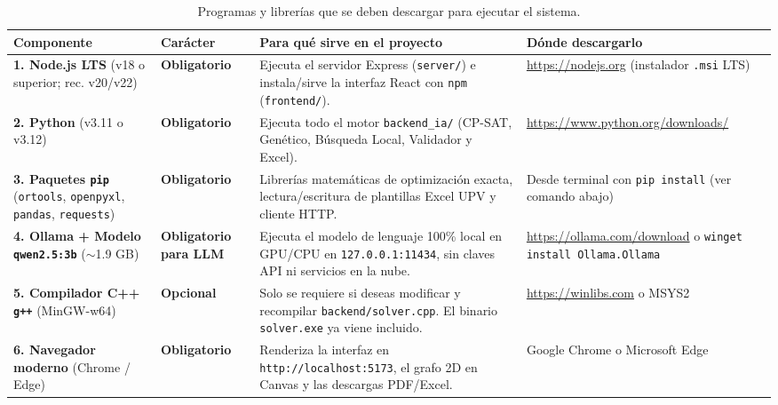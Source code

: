 \documentclass[11pt,letterpaper]{article}
\begin{document}
\begin{table}[htbp]
\centering
\small
\caption{Programas y librerías que se deben descargar para ejecutar el sistema.}
\label{tab:descargas}
\begin{tabularx}{\textwidth}{@{}>{\raggedright\arraybackslash}p{3.2cm}>{\raggedright\arraybackslash}p{2.2cm}>{\raggedright\arraybackslash}X>{\raggedright\arraybackslash}p{4.3cm}@{}}
\toprule
\textbf{Componente} & \textbf{Carácter} & \textbf{Para qué sirve en el proyecto} & \textbf{Dónde descargarlo} \\
\midrule
\textbf{1. Node.js LTS} (v18 o superior; rec. v20/v22) & \textbf{Obligatorio} & Ejecuta el servidor Express (\texttt{server/}) e instala/sirve la interfaz React con \texttt{npm} (\texttt{frontend/}). & \url{https://nodejs.org} (instalador \texttt{.msi} LTS) \\
\addlinespace[3pt]
\textbf{2. Python} (v3.11 o v3.12) & \textbf{Obligatorio} & Ejecuta todo el motor \texttt{backend\_ia/} (CP-SAT, Genético, Búsqueda Local, Validador y Excel). & \url{https://www.python.org/downloads/} \\
\addlinespace[3pt]
\textbf{3. Paquetes \texttt{pip}} (\texttt{ortools}, \texttt{openpyxl}, \texttt{pandas}, \texttt{requests}) & \textbf{Obligatorio} & Librerías matemáticas de optimización exacta, lectura/escritura de plantillas Excel UPV y cliente HTTP. & Desde terminal con \texttt{pip install} (ver comando abajo) \\
\addlinespace[3pt]
\textbf{4. Ollama + Modelo \texttt{qwen2.5:3b}} ($\sim$1.9 GB) & \textbf{Obligatorio para LLM} & Ejecuta el modelo de lenguaje 100\% local en GPU/CPU en \texttt{127.0.0.1:11434}, sin claves API ni servicios en la nube. & \url{https://ollama.com/download} o \texttt{winget install Ollama.Ollama} \\
\addlinespace[3pt]
\textbf{5. Compilador C++ \texttt{g++}} (MinGW-w64) & \textbf{Opcional} & Solo se requiere si deseas modificar y recompilar \texttt{backend/solver.cpp}. El binario \texttt{solver.exe} ya viene incluido. & \url{https://winlibs.com} o MSYS2 \\
\addlinespace[3pt]
\textbf{6. Navegador moderno} (Chrome / Edge) & \textbf{Obligatorio} & Renderiza la interfaz en \texttt{http://localhost:5173}, el grafo 2D en Canvas y las descargas PDF/Excel. & Google Chrome o Microsoft Edge \\
\bottomrule
\end{tabularx}
\end{table}
\end{document}
